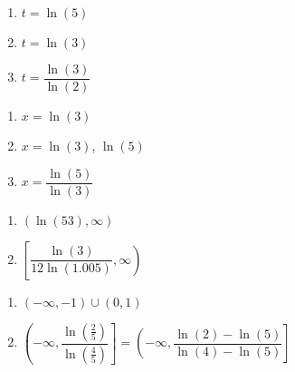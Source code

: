 \documentclass{ximera}
\begin{document}
\begin{multicols}{3}
\begin{enumerate}
\setcounter{enumi}{\value{HW}}

\item $t=\ln(5)$ 
\item $t=\ln(3)$  
\item $t=\dfrac{\ln(3)}{\ln(2)}$


\setcounter{HW}{\value{enumi}}
\end{enumerate}
\end{multicols}

\begin{multicols}{3}
\begin{enumerate}
\setcounter{enumi}{\value{HW}}

\item $x=\ln(3)$  
\item $x=\ln(3)$, $\ln(5)$  
\item $x=\dfrac{\ln(5)}{\ln(3)}$


\setcounter{HW}{\value{enumi}}
\end{enumerate}
\end{multicols}

\begin{multicols}{2} 
\begin{enumerate}
\setcounter{enumi}{\value{HW}}

\item $(\ln(53), \infty)$ \vphantom{$\left[\dfrac{\ln(3)}{12\ln(1.005)}, \infty\right)$}
\item $\left[\dfrac{\ln(3)}{12\ln(1.005)}, \infty\right)$

\setcounter{HW}{\value{enumi}}
\end{enumerate}
\end{multicols}

\begin{multicols}{2} 
\begin{enumerate}
\setcounter{enumi}{\value{HW}}

\item $(-\infty, -1) \cup (0, 1)$ \vphantom{$\left(-\infty, \dfrac{\ln\left(\frac{2}{5}\right)}{\ln\left(\frac{4}{5}\right)} \right] = \left(-\infty, \dfrac{\ln(2)-\ln(5)}{\ln(4)-\ln(5)} \right]$} 

\item $\left(-\infty, \dfrac{\ln\left(\frac{2}{5}\right)}{\ln\left(\frac{4}{5}\right)} \right] = \left(-\infty, \dfrac{\ln(2)-\ln(5)}{\ln(4)-\ln(5)} \right]$

\setcounter{HW}{\value{enumi}}
\end{enumerate}
\end{multicols}
\end{document}
